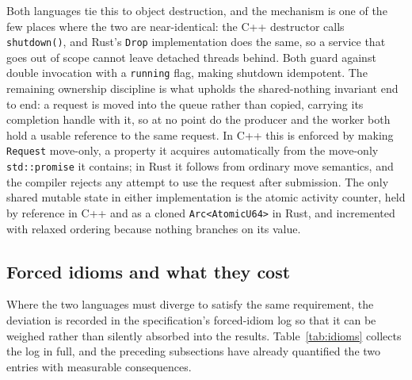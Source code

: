 \documentclass[english,twoside,openright,a4paper,censored,csm,software-track-2020]{HYthesisML}
\begin{document}
Both languages tie this to object destruction, and the mechanism is one of the few places
where the two are near-identical: the C++ destructor calls \texttt{shutdown()}, and Rust's
\texttt{Drop} implementation does the same, so a service that goes out of scope cannot leave
detached threads behind. Both guard against double invocation with a \texttt{running} flag,
making shutdown idempotent. The remaining ownership discipline is what upholds the
shared-nothing invariant end to end: a request is moved into the queue rather than copied,
carrying its completion handle with it, so at no point do the producer and the worker both
hold a usable reference to the same request. In C++ this is enforced by making
\texttt{Request} move-only, a property it acquires automatically from the move-only
\texttt{std::promise} it contains; in Rust it follows from ordinary move semantics, and the
compiler rejects any attempt to use the request after submission. The only shared mutable
state in either implementation is the atomic activity counter, held by reference in C++ and
as a cloned \texttt{Arc<AtomicU64>} in Rust, and incremented with relaxed ordering because
nothing branches on its value.

\subsection{Forced idioms and what they cost}
\label{sec:idioms}
Where the two languages must diverge to satisfy the same requirement, the deviation is
recorded in the specification's forced-idiom log so that it can be weighed rather than
silently absorbed into the results. Table~\ref{tab:idioms} collects the log in full, and the
preceding subsections have already quantified the two entries with measurable consequences.
\end{document}
